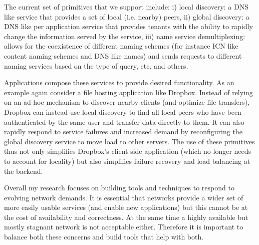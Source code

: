 \documentclass[letterpaper]{article}
\begin{document}
The current set of primitives that we support include: i) local discovery: a DNS like service that provides a
set of local (i.e. nearby) peers, ii) global discovery: a DNS like per application service that provides
tenants with the ability to rapidly change the information served by the service, iii) name service
demultiplexing: allows for the coexistence of different naming schemes (for instance ICN like content naming
schemes and DNS like names) and sends requests to different naming services based on the type of query, etc.
and others.

Applications compose these services to provide desired functionality. As an example again consider a file hosting
application like Dropbox. Instead of relying on an ad hoc mechanism to discover nearby clients (and optimize file
transfers), Dropbox can instead use local discovery to find all local peers who have been authenticated by the same user
and transfer data directly to them. It can also rapidly respond to service failures and increased demand by
reconfiguring the global discovery service to move load to other servers. The use of these primitives thus not only simplifies
Dropbox's client side application (which no longer needs to account for locality) but also simplifies failure recovery and load
balancing at the backend.

Overall my research focuses on building tools and techniques to respond to evolving network demands. It is essential
that networks provide a wider set of more easily usable services (and enable new applications) but this cannot be at the
cost of availability and correctness. At the same time a highly available but mostly stagnant network is not acceptable
either. Therefore it is important to balance both these concerns and build tools that help with both.


\end{document}
